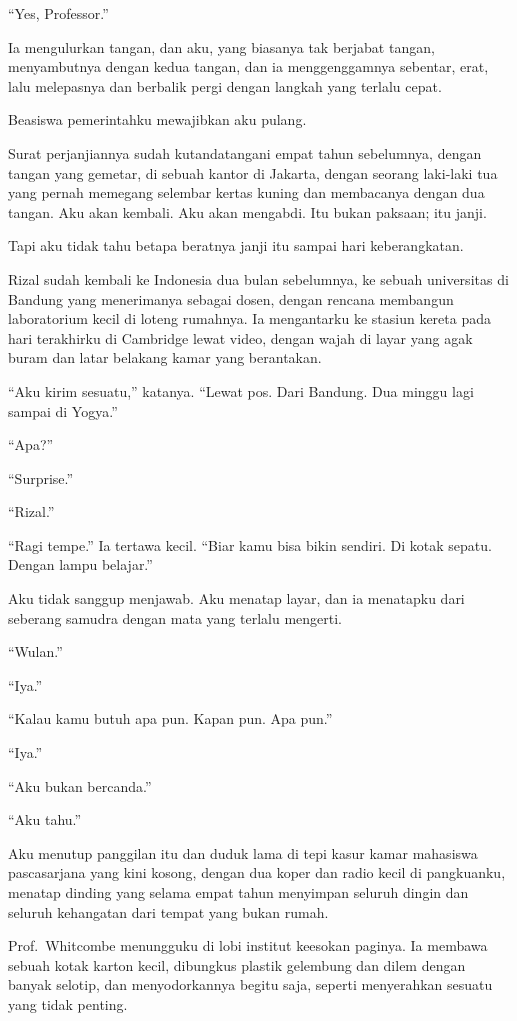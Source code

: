 \documentclass[11pt,twoside,openany]{book}
\makeatletter
\newcommand{\scenebreak}{\par\vspace{0.9em}{\centering\textsc{*\hspace{0.7em}*\hspace{0.7em}*}\par}\vspace{0.9em}\@afterindentfalse\@afterheading}
\makeatother
\begin{document}
``Yes, Professor.''

Ia mengulurkan tangan, dan aku, yang biasanya tak berjabat tangan, menyambutnya dengan kedua tangan, dan ia menggenggamnya sebentar, erat, lalu melepasnya dan berbalik pergi dengan langkah yang terlalu cepat.

\scenebreak
Beasiswa pemerintahku mewajibkan aku pulang.

Surat perjanjiannya sudah kutandatangani empat tahun sebelumnya, dengan tangan yang gemetar, di sebuah kantor di Jakarta, dengan seorang laki-laki tua yang pernah memegang selembar kertas kuning dan membacanya dengan dua tangan. Aku akan kembali. Aku akan mengabdi. Itu bukan paksaan; itu janji.

Tapi aku tidak tahu betapa beratnya janji itu sampai hari keberangkatan.

Rizal sudah kembali ke Indonesia dua bulan sebelumnya, ke sebuah universitas di Bandung yang menerimanya sebagai dosen, dengan rencana membangun laboratorium kecil di loteng rumahnya. Ia mengantarku ke stasiun kereta pada hari terakhirku di Cambridge lewat video, dengan wajah di layar yang agak buram dan latar belakang kamar yang berantakan.

``Aku kirim sesuatu,'' katanya. ``Lewat pos. Dari Bandung. Dua minggu lagi sampai di Yogya.''

``Apa?''

``Surprise.''

``Rizal.''

``Ragi tempe.'' Ia tertawa kecil. ``Biar kamu bisa bikin sendiri. Di kotak sepatu. Dengan lampu belajar.''

Aku tidak sanggup menjawab. Aku menatap layar, dan ia menatapku dari seberang samudra dengan mata yang terlalu mengerti.

``Wulan.''

``Iya.''

``Kalau kamu butuh apa pun. Kapan pun. Apa pun.''

``Iya.''

``Aku bukan bercanda.''

``Aku tahu.''

Aku menutup panggilan itu dan duduk lama di tepi kasur kamar mahasiswa pascasarjana yang kini kosong, dengan dua koper dan radio kecil di pangkuanku, menatap dinding yang selama empat tahun menyimpan seluruh dingin dan seluruh kehangatan dari tempat yang bukan rumah.

Prof.~Whitcombe menungguku di lobi institut keesokan paginya. Ia membawa sebuah kotak karton kecil, dibungkus plastik gelembung dan dilem dengan banyak selotip, dan menyodorkannya begitu saja, seperti menyerahkan sesuatu yang tidak penting.
\end{document}
